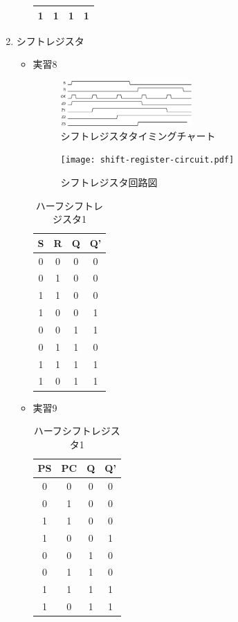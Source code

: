 \documentclass[dvipdfmx, a4paper]{jsarticle}
\begin{document}
\begin{enumerate}
\begin{itemize}
\begin{table}[H]
\begin{tabular}{|c|c|c|c|}
								1 & 1 & 1 & 1 \\ \hline
							\end{tabular}
						\end{table}
				\end{itemize}
			\item シフトレジスタ
				\begin{itemize}
					\item 実習8
						\begin{figure}[H]
							\center
							\includegraphics[width=5cm]{shift.eps}
							\caption{シフトレジスタタイミングチャート}
						\end{figure}
						\begin{figure}[H]
							\center
							\texttt{[image: shift-register-circuit.pdf]}
							\caption{シフトレジスタ回路図}
						\end{figure}
						\begin{table}[H]
							\center
							\caption{ハーフシフトレジスタ1}
							\begin{tabular}{|c|c|c|c|}
								\hline
								S & R & Q & Q'\\ \hline
								0 & 0 & 0 & 0 \\ \hline
								0 & 1 & 0 & 0 \\ \hline
								1 & 1 & 0 & 0 \\ \hline
								1 & 0 & 0 & 1 \\ \hline
								0 & 0 & 1 & 1 \\ \hline
								0 & 1 & 1 & 0 \\ \hline
								1 & 1 & 1 & 1 \\ \hline
								1 & 0 & 1 & 1 \\ \hline
							\end{tabular}
						\end{table}
					\item 実習9
						\begin{table}[H]
							\center
							\caption{ハーフシフトレジスタ1}
							\begin{tabular}{|c|c|c|c|}
								\hline
								PS & PC & Q & Q'\\ \hline
								0 & 0 & 0 & 0 \\ \hline
								0 & 1 & 0 & 0 \\ \hline
								1 & 1 & 0 & 0 \\ \hline
								1 & 0 & 0 & 1 \\ \hline
								0 & 0 & 1 & 0 \\ \hline
								0 & 1 & 1 & 0 \\ \hline
								1 & 1 & 1 & 1 \\ \hline
								1 & 0 & 1 & 1 \\ \hline
							\end{tabular}
						\end{table}
				\end{itemize}
		\end{enumerate}
\end{document}
